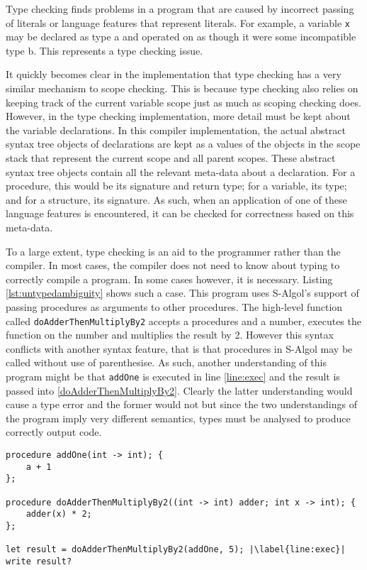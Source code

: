\documentclass{article}
\begin{document}
Type checking finds problems in a program that are caused by incorrect passing of literals or language features that represent literals. For example, a variable \lstinline{x} may be declared as type a and operated on as though it were some incompatible type b. This represents a type checking issue.

It quickly becomes clear in the implementation that type checking has a very similar mechanism to scope checking. This is because type checking also relies on keeping track of the current variable scope just as much as scoping checking does. However, in the type checking implementation, more detail must be kept about the variable declarations. In this compiler implementation, the actual abstract syntax tree objects of declarations are kept as a values of the objects in the scope stack that represent the current scope and all parent scopes. These abstract syntax tree objects contain all the relevant meta-data about a declaration. For a procedure, this would be its signature and return type; for a variable, its type; and for a structure, its signature. As such, when an application of one of these language features is encountered, it can be checked for correctness based on this meta-data.

To a large extent, type checking is an aid to the programmer rather than the compiler. In most cases, the compiler does not need to know about typing to correctly compile a program. In some cases however, it is necessary. Listing \ref{lst:untypedambiguity} shows such a case. This program uses S-Algol's support of passing procedures as arguments to other procedures. The high-level function called \lstinline{doAdderThenMultiplyBy2} accepts a procedures and a number, executes the function on the number and multiplies the result by 2. However this syntax conflicts with another syntax feature, that is that procedures in S-Algol may be called without use of parenthesise. As such, another understanding of this program might be that \lstinline{addOne} is executed in line \ref{line:exec} and the result is passed into \ref{doAdderThenMultiplyBy2}. Clearly the latter understanding would cause a type error and the former would not but since the two understandings of the program imply very different semantics, types must be analysed to produce correctly output code.

\begin{lstlisting}[caption={},label={lst:untypedambiguity}, escapechar="|"]
procedure addOne(int -> int); {
	a + 1
};

procedure doAdderThenMultiplyBy2((int -> int) adder; int x -> int); {
	adder(x) * 2;
};

let result = doAdderThenMultiplyBy2(addOne, 5); |\label{line:exec}|
write result?
\end{lstlisting}
\end{document}
